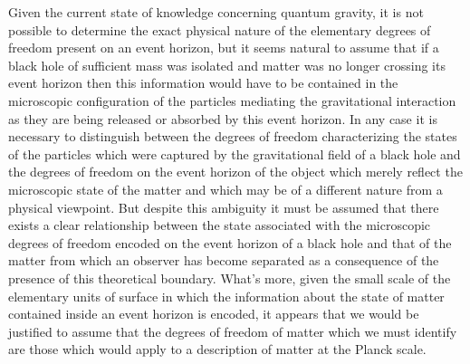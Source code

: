 \documentclass[notitlepage,12pt]{report}
\begin{document}
Given the current state of knowledge concerning quantum gravity, it is not possible to determine the exact physical nature of the elementary degrees of freedom present on an event horizon, but it seems natural to assume that if a black hole of sufficient mass was isolated and matter was no longer crossing its event horizon then this information would have to be contained in the microscopic configuration of the particles mediating the gravitational interaction as they are being released or absorbed by this event horizon. In any case it is necessary to distinguish between the degrees of freedom characterizing the states of the particles which were captured by the gravitational field of a black hole and the degrees of freedom on the event horizon of the object which merely reflect the microscopic state of the matter and which may be of a different nature from a physical viewpoint. But despite this ambiguity it must be assumed that there exists a clear relationship between the state associated with the microscopic degrees of freedom encoded on the event horizon of a black hole and that of the matter from which an observer has become separated as a consequence of the presence of this theoretical boundary. What's more, given the small scale of the elementary units of surface in which the information about the state of matter contained inside an event horizon is encoded, it appears that we would be justified to assume that the degrees of freedom of matter which we must identify are those which would apply to a description of matter at the Planck scale.
\end{document}
